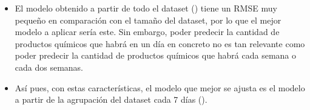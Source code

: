 \begin{itemize}
 \item El modelo obtenido a partir de todo el dataset () tiene un RMSE muy pequeño en comparación con el tamaño del dataset, por lo que el mejor modelo a aplicar sería este. Sin embargo, poder predecir la cantidad de productos químicos que habrá en un día en concreto no es tan relevante como poder predecir la cantidad de productos químicos que habrá cada semana o cada dos semanas.
 
 \item Así pues, con estas características, el modelo que mejor se ajusta es el modelo a partir de la agrupación del dataset cada 7 días ().

\end{itemize}



















